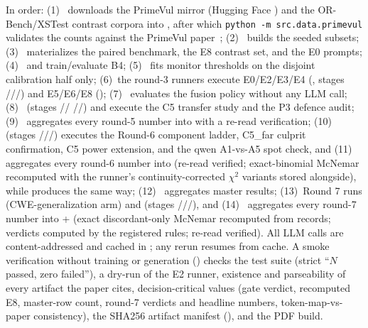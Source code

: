 \begin{sloppypar}
In order: (1)~ downloads the PrimeVul mirror
(Hugging Face ) and the OR-Bench/XSTest contrast
corpora into , after which \texttt{python -m src.data.primevul}
validates the counts against the PrimeVul paper~\cite{ding2025primevul};
(2)~ builds the seeded
subsets; (3)~ materializes the paired benchmark,
the E8 contrast set, and the E0 prompts; (4)~
and  train/evaluate B4; (5)~
 fits monitor thresholds on the
disjoint calibration half only; (6)~the round-3 runners execute
E0/E2/E3/E4 (, stages
///) and
E5/E6/E8 (); (7)~
 evaluates the fusion policy without any LLM
call; (8)~ (stages //
//) and
 execute the C5 transfer study and the
P3 defence audit; (9)~ aggregates
every round-5 number into  with a
re-read verification; (10)~
(stages ///) executes the
Round-6 component ladder, C5\_far culprit confirmation, C5 power
extension, and the qwen A1-vs-A5 spot check, and
(11)~ aggregates every round-6
number into 
(re-read verified; exact-binomial McNemar recomputed with the runner's
continuity-corrected $\chi^2$ variants stored alongside), while
 produces
 the same way;
(12)~ aggregates master results;
(13)~Round 7 runs  (CWE-generalization
arm) and  (stages
///), and
(14)~ aggregates every round-7
number into  +
 (exact discordant-only McNemar recomputed
from records; verdicts computed by the registered rules; re-read verified).
All LLM calls are content-addressed and cached in ;
any rerun resumes from cache. A smoke verification without training or
generation () checks the test suite
(strict ``$N$ passed, zero failed''), a dry-run of the E2 runner, existence
and parseability of every artifact the paper cites, decision-critical values
(gate verdict, recomputed E8, master-row count, round-7 verdicts and
headline numbers, token-map-vs-paper consistency), the SHA256 artifact
manifest (), and the PDF build.
\end{sloppypar}

